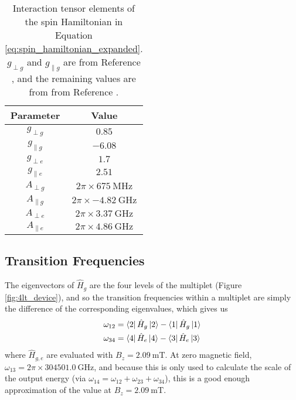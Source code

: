 \begin{table}[h]
\centering
\begin{tabular}{c|c}
Parameter & Value\\
\hline
$g_{\perp g}$ & $\num{0.85}$\\
$g_{\parallel g}$ & $\num{-6.08}$\\
$g_{\perp e}$ & $\num{1.7}$\\
$g_{\parallel e}$ & $\num{2.51}$\\
$A_{\perp g}$ & $2\pi \times \qty{675}{\mega\hertz}$\\
$A_{\parallel g}$ & $2\pi \times \qty{-4.82}{\giga\hertz}$\\
$A_{\perp e}$ & $2\pi \times \qty{3.37}{\giga\hertz}$\\
$A_{\parallel e}$ & $2\pi \times \qty{4.86}{\giga\hertz}$\\
\end{tabular}
\caption{\label{tab:spin_hamiltonian_parameters} Interaction tensor elements of the spin Hamiltonian in Equation \ref{eq:spin_hamiltonian_expanded}. $g_{\perp g}$ and $g_{\parallel g}$ are from Reference \cite{ranon_1968}, and the remaining values are from from Reference \cite{kindem_characterization_2018}.}
\end{table}

\subsection{Transition Frequencies}
The eigenvectors of $\hat{H}_g$ are the four levels of the multiplet (Figure \ref{fig:4lt_device}), and so the transition frequencies within a multiplet are simply the difference of the corresponding eigenvalues, which gives us
\begin{align}
    \omega_{12} &= \left\langle2\right|\hat{H}_g\left|2\right\rangle - \left\langle1\right|\hat{H}_g\left|1\right\rangle\\
    \omega_{34} &= \left\langle4\right|\hat{H}_e\left|4\right\rangle - \left\langle3\right|\hat{H}_e\left|3\right\rangle
\end{align}
where $\hat{H}_{g,e}$ are evaluated with $B_z = \qty{2.09}{\milli\tesla}$. At zero magnetic field\cite{bartholomew_chip_2020}, $\omega_{13} = 2\pi \times \qty{304501.0}{\giga\hertz}$, and because this is only used to calculate the scale of the output energy (via $\omega_{14} = \omega_{12} + \omega_{23} + \omega_{34}$), this is a good enough approximation of the value at $B_z = \qty{2.09}{\milli\tesla}$.

